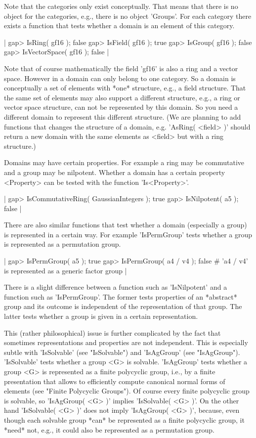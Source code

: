 Note that the categories only  exist conceptually.  That means that there
is  no  {\GAP}  object  for the  categories, e.g.,  there  is  no  object
'Groups'.  For each category there exists a function that tests whether a
domain is an element of this category.

|    gap> IsRing( gf16 );
    false
    gap> IsField( gf16 );
    true
    gap> IsGroup( gf16 );
    false
    gap> IsVectorSpace( gf16 );
    false |

Note that of course mathematically the field 'gf16' is also a ring  and a
vector space.   However in  {\GAP}  a  domain  can  only  belong  to  one
category.   So  a domain is  conceptually  a set  of elements  with *one*
structure, e.g.,  a field  structure.  That  the same set of elements may
also  support  a  different structure,  e.g.,  a  ring  or  vector  space
structure,  can  not  be represented  by  this  domain.  So  you  need  a
different domain to represent this different structure.  (We are planning
to add functions that changes the  structure of  a domain, e.g.  'AsRing(
<field>  )' should return  a new domain with the same elements as <field>
but with a ring structure.)

Domains  may  have  certain  properties.   For  example  a  ring  may  be
commutative and a group may be nilpotent.  Whether a domain has a certain
property <Property> can be tested with the function 'Is<Property>'.

|    gap> IsCommutativeRing( GaussianIntegers );
    true
    gap> IsNilpotent( a5 );
    false |

There are also similar functions that test whether a domain (especially a
group) is represented in a certain way.  For example 'IsPermGroup'  tests
whether a group is represented as a permutation group.

|    gap> IsPermGroup( a5 );
    true
    gap> IsPermGroup( a4 / v4 );
    false    # 'a4 / v4' is represented as a generic factor group |

There is a slight difference between a function such as 'IsNilpotent' and
a function such  as 'IsPermGroup'.  The  former  tests  properties  of an
*abstract* group and its outcome is independent of the representation  of
that  group.  The  latter tests whether  a  group  is given in  a certain
representation.

This (rather philosophical) issue is further complicated by the fact that
sometimes  representations and properties are  not independent.  This  is
especially  subtle with 'IsSolvable' (see  "IsSolvable")  and 'IsAgGroup'
(see "IsAgGroup").  'IsSolvable' tests whether a group  <G>  is solvable.
'IsAgGroup'  tests  whether  a  group  <G>  is  represented  as  a finite
polycyclic  group,  i.e.,  by  a  finite  presentation  that  allows   to
efficiently compute  canonical  normal forms  of  elements  (see  "Finite
Polycyclic  Groups").   Of   course  every  finite  polycyclic  group  is
solvable, so 'IsAgGroup(  <G> )'  implies 'IsSolvable( <G>  )'.   On  the
other  hand  'IsSolvable(  <G>  )'  does  not  imply 'IsAgGroup( <G>  )',
because, even though each solvable group *can* be represented as a finite
polycyclic group, it *need* not, e.g., it could also be represented  as a
permutation group.

